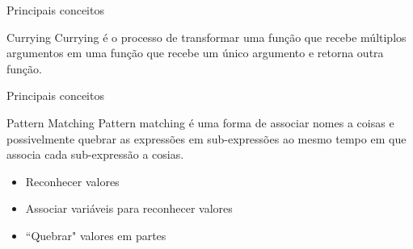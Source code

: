 \begin{frame}{Principais conceitos}
	\begin{block}{Currying}
		Currying é o processo de transformar uma função que recebe múltiplos
		argumentos em uma função que recebe um único argumento e retorna outra função.
	\end{block}
	
	\begin{center}
		
	\end{center}
\end{frame}
 
\begin{frame}{Principais conceitos}
	\begin{block}{Pattern Matching}
	Pattern matching é uma forma de associar nomes a coisas e possivelmente quebrar as expressões
	em sub-expressões ao mesmo tempo em que associa cada sub-expressão a cosias.
		\begin{itemize}
			\item Reconhecer valores
			\item Associar variáveis para reconhecer valores
			\item ``Quebrar" valores em partes
		\end{itemize}
	\end{block}
	
	\begin{center}
		
	\end{center}
\end{frame}
